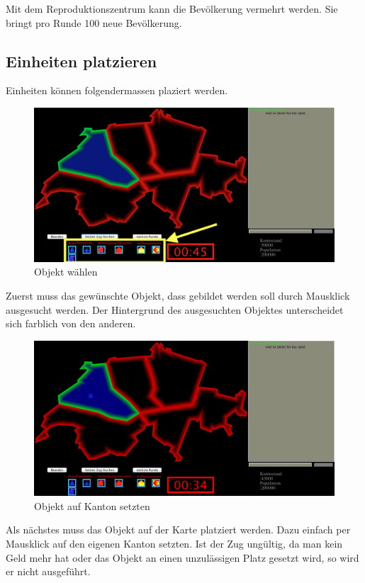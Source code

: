 \documentclass[ngerman, 12pt, pdftex]{scrartcl}[2006/07/30]
\begin{document}
Mit dem Reproduktionszentrum kann die Bevölkerung vermehrt werden. Sie bringt pro Runde 100 neue Bevölkerung.

\newpage

\subsection{Einheiten platzieren}

Einheiten können folgendermassen plaziert werden. 

\begin{figure}[h]
\centering
\includegraphics[scale=0.3]{spiel/Objekt_aussuchen.png}
\caption{Objekt wählen}
\end{figure}

Zuerst muss das gewünschte Objekt, dass gebildet werden soll durch Mausklick ausgesucht werden. Der Hintergrund des ausgesuchten Objektes unterscheidet sich farblich von den anderen.

\begin{figure}[h]
\centering
\includegraphics[scale=0.3]{spiel/Objekt_setzen.png}
\caption{Objekt auf Kanton setzten}
\end{figure}

Als nächstes muss das Objekt auf der Karte platziert werden. Dazu einfach per Mausklick auf den eigenen Kanton setzten. Ist der Zug ungültig, da man kein Geld mehr hat oder das Objekt an einen unzulässigen Platz gesetzt wird, so wird er nicht ausgeführt.
\end{document}
